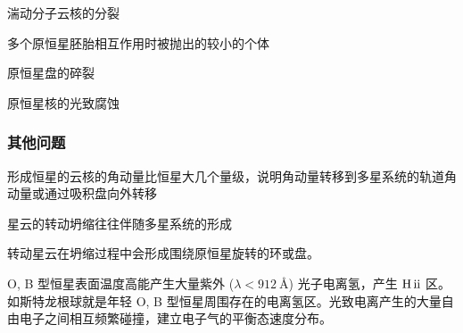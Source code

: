 \documentclass[../天体物理基础.tex]{subfiles}
\begin{document}
湍动分子云核的分裂

多个原恒星胚胎相互作用时被抛出的较小的个体

原恒星盘的碎裂

原恒星核的光致腐蚀

\subsubsection{其他问题}

形成恒星的云核的角动量比恒星大几个量级，说明角动量转移到多星系统的轨道角动量或通过吸积盘向外转移

星云的转动坍缩往往伴随多星系统的形成

转动星云在坍缩过程中会形成围绕原恒星旋转的环或盘。




O, B 型恒星表面温度高能产生大量紫外 ($\lambda<\qty{912}{\angstrom}$) 光子电离氢，产生 $\ce{H}\,\mathrm{\uppercase\expandafter{\romannumeral2}}$ 区。如斯特龙根球就是年轻 O, B 型恒星周围存在的电离氢区。光致电离产生的大量自由电子之间相互频繁碰撞，建立电子气的平衡态速度分布。



\end{document}
